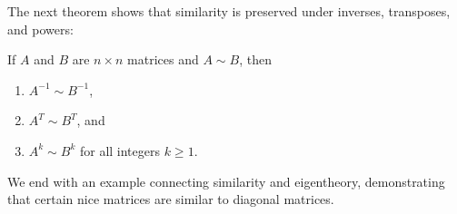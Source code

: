 \documentclass{ximera}
\begin{document}
The next theorem shows that similarity is preserved under inverses, transposes, and powers:
 
\begin{theorem}\label{th:other_properties_similar}
If $A$ and $B$ are $n\times n$ matrices and $A\sim B$, then
\begin{enumerate}
\item\label{th:properties_similar_inverse} $A^{-1} \sim B^{-1}$,
\item\label{th:properties_similar_transpose} $A^T \sim B^T$, and
\item\label{th:properties_similar_powers} $A^k \sim B^k$ for all integers $k \geq 1$.
\end{enumerate}
\end{theorem}
 
We end with an example connecting similarity and eigentheory, demonstrating that certain nice matrices are similar to diagonal matrices.
\end{document}
